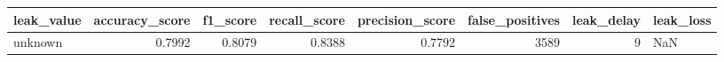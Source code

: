 \begin{tabular}{lrrrrrrl}
\toprule
leak\_value & accuracy\_score & f1\_score & recall\_score & precision\_score & false\_positives & leak\_delay & leak\_loss \\
\midrule
unknown & 0.7992 & 0.8079 & 0.8388 & 0.7792 & 3589 & 9 & NaN \\
\bottomrule
\end{tabular}
